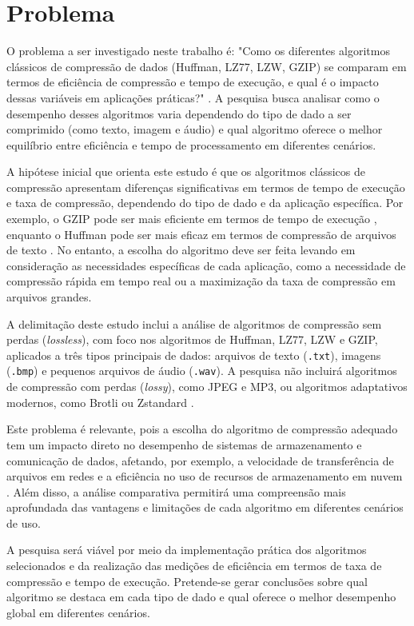 \chapter{Problema}
\label{c.problema}

O problema a ser investigado neste trabalho é: "Como os diferentes algoritmos clássicos de compressão de dados (Huffman, LZ77, LZW, GZIP) se comparam em termos de eficiência de compressão e tempo de execução, e qual é o impacto dessas variáveis em aplicações práticas?" \cite{salomon2007data}. A pesquisa busca analisar como o desempenho desses algoritmos varia dependendo do tipo de dado a ser comprimido (como texto, imagem e áudio) e qual algoritmo oferece o melhor equilíbrio entre eficiência e tempo de processamento em diferentes cenários.

A hipótese inicial que orienta este estudo é que os algoritmos clássicos de compressão apresentam diferenças significativas em termos de tempo de execução e taxa de compressão, dependendo do tipo de dado e da aplicação específica. Por exemplo, o GZIP pode ser mais eficiente em termos de tempo de execução \cite{deutsch1996gzip}, enquanto o Huffman pode ser mais eficaz em termos de compressão de arquivos de texto \cite{salomon2007data}. No entanto, a escolha do algoritmo deve ser feita levando em consideração as necessidades específicas de cada aplicação, como a necessidade de compressão rápida em tempo real ou a maximização da taxa de compressão em arquivos grandes.

A delimitação deste estudo inclui a análise de algoritmos de compressão sem perdas (\textit{lossless}), com foco nos algoritmos de Huffman, LZ77, LZW e GZIP, aplicados a três tipos principais de dados: arquivos de texto (\texttt{.txt}), imagens (\texttt{.bmp}) e pequenos arquivos de áudio (\texttt{.wav}). A pesquisa não incluirá algoritmos de compressão com perdas (\textit{lossy}), como JPEG e MP3, ou algoritmos adaptativos modernos, como Brotli \cite{alakuijala2016brotli} ou Zstandard \cite{collet2016zstandard}.

Este problema é relevante, pois a escolha do algoritmo de compressão adequado tem um impacto direto no desempenho de sistemas de armazenamento e comunicação de dados, afetando, por exemplo, a velocidade de transferência de arquivos em redes e a eficiência no uso de recursos de armazenamento em nuvem \cite{deutsch1996gzip}. Além disso, a análise comparativa permitirá uma compreensão mais aprofundada das vantagens e limitações de cada algoritmo em diferentes cenários de uso.

A pesquisa será viável por meio da implementação prática dos algoritmos selecionados e da realização das medições de eficiência em termos de taxa de compressão e tempo de execução. Pretende-se gerar conclusões sobre qual algoritmo se destaca em cada tipo de dado e qual oferece o melhor desempenho global em diferentes cenários.

